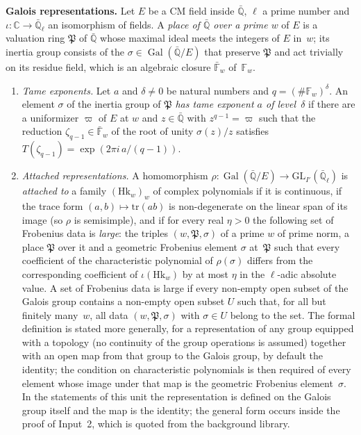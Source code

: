 \documentclass[11pt,a4paper]{article}
\newcommand{\F}{\mathbb{F}}
\newcommand{\Gal}{\operatorname{Gal}}
\newcommand{\m}[1]{\mbox{$#1$}}        %
\newcommand{\subhead}[1]{\par\addvspace{9pt plus 2pt}\Needspace{4\baselineskip}\noindent\textbf{#1}\enspace\ignorespaces}
\theoremstyle{plainx}
\theoremstyle{uprightx}
\newcommand{\GL}{\mathrm{GL}}
\begin{document}
\subhead{Galois representations.} Let $E$ be a CM field inside $\bar{\mathbb Q}$, $\ell$ a prime number and
\m{\iota\colon\mathbb C\to\bar{\mathbb Q}_\ell} an isomorphism of fields. A \emph{place of $\bar{\mathbb Q}$ over
a prime $w$} of $E$ is a valuation ring $\mathfrak P$ of $\bar{\mathbb Q}$ whose maximal ideal meets the integers
of $E$ in~$w$; its inertia group consists of the \m{\sigma\in\Gal(\bar{\mathbb Q}/E)} that preserve $\mathfrak P$ and
act trivially on its residue field, which is an algebraic closure $\bar{\F}_w$ of~$\F_w$.
\begin{enumerate}[label=\textup{(\alph*)},leftmargin=2.3em,itemsep=2pt,start=7]
\item \emph{Tame exponents.} Let $a$ and \m{\delta\ne0} be natural numbers and \m{q=(\#\F_w)^\delta}. An element
$\sigma$ of the inertia group of $\mathfrak P$ \emph{has tame exponent $a$ of level~$\delta$} if there are a
uniformizer $\varpi$ of $E$ at $w$ and \m{z\in\bar{\mathbb Q}} with \m{z^{q-1}=\varpi} such that the reduction
\m{\zeta_{q-1}\in\bar{\F}_w} of the root of unity \m{\sigma(z)/z} satisfies \m{T(\zeta_{q-1})=\exp(2\pi i\,a/(q-1))}.
\item \emph{Attached representations.} A homomorphism \m{\rho\colon\Gal(\bar{\mathbb Q}/E)\to\GL_{I'}(\bar{\mathbb Q}_\ell)}
is \emph{attached to} a family \m{(\mathrm{Hk}_w)_w} of complex polynomials if it is continuous, if the trace
form \m{(a,b)\mapsto\mathrm{tr}(ab)} is non-degenerate on the linear span of its image (so $\rho$ is semisimple),
and if for every real \m{\eta>0} the following set of Frobenius data is \emph{large}: the triples
\m{(w,\mathfrak P,\sigma)} of a prime $w$ of prime norm, a place $\mathfrak P$ over it and a geometric Frobenius
element $\sigma$ at~$\mathfrak P$ such that every coefficient of the characteristic polynomial of
\m{\rho(\sigma)} differs from the corresponding coefficient of \m{\iota(\mathrm{Hk}_w)} by at most $\eta$ in the
$\ell$-adic absolute value. A set of Frobenius data is large if every non-empty open subset of the Galois group
contains a non-empty open subset $U$ such that, for all but finitely many~$w$, all data \m{(w,\mathfrak P,\sigma)}
with \m{\sigma\in U} belong to the set. The formal definition is stated more generally, for a representation of any group equipped with a
topology (no continuity of the group operations is assumed) together with an open map from that group to the Galois
group, by default the identity; the condition on characteristic polynomials is then required of every element whose
image under that map is the geometric Frobenius element~$\sigma$. In the statements of this
unit the representation is defined on the Galois group itself and the map is the identity; the general form occurs
inside the proof of Input~2, which is quoted from the background library.
\end{enumerate}
\end{document}
